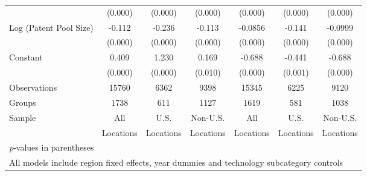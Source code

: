 {\begin{longtable}{l*{6}{c}}
                &  (0.000)&  (0.000)&  (0.000)&  (0.000)&  (0.000)&  (0.000)\\
Log (Patent Pool Size)&   -0.112&   -0.236&   -0.113&  -0.0856&   -0.141&  -0.0999\\
                &  (0.000)&  (0.000)&  (0.000)&  (0.000)&  (0.000)&  (0.000)\\
Constant        &    0.409&    1.230&    0.169&   -0.688&   -0.441&   -0.688\\
                &  (0.000)&  (0.000)&  (0.010)&  (0.000)&  (0.001)&  (0.000)\\
\hline
Observations    &    15760&     6362&     9398&    15345&     6225&     9120\\
Groups          &     1738&      611&     1127&     1619&      581&     1038\\
Sample&All &U.S. &Non-U.S.&All &U.S. &Non-U.S. \\
          &Locations &Locations&Locations&Locations &Locations&Locations \\\hline\hline
\multicolumn{7}{l}{\footnotesize \textit{p}-values in parentheses}\\
\multicolumn{7}{l}{\footnotesize All models include region fixed effects, year dummies and technology subcategory controls}\\
\end{longtable}
}

